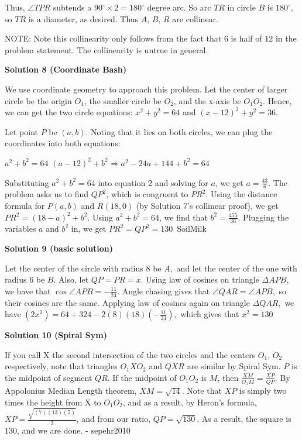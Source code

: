 \begin{enumerate}
 Thus, $\angle TPR$ subtends a $90^\circ \times 2 = 180^\circ$ degree arc. So arc $TR$ in circle $B$ is $180^\circ$, so $TR$ is a diameter, as desired. Thus $A$, $B$, $R$ are collinear.

 NOTE: Note this collinearity only follows from the fact that $6$ is half of $12$ in the problem statement. The collinearity is untrue in general.

 



\textbf{Solution 8 (Coordinate Bash)}

We use coordinate geometry to approach this problem. Let the center of larger circle be the origin $O_1$, the smaller circle be $O_2$, and the x-axis be $O_1O_2$. Hence, we can get the two circle equations: $x^2+y^2 = 64$ and $(x-12)^2+y^2=36$.

 Let point $P$ be $(a, b)$. Noting that it lies on both circles, we can plug the coordinates into both equations:

 $a^2 +b^2 = 64$
$(a-12)^2+ b^2 \Rightarrow a^2-24a+144+b^2 = 64$

 Substituting $a^2+b^2 = 64$ into equation 2 and solving for $a$, we get $a = \frac{43}{6}$. The problem asks us to find $QP^2$, which is congruent to $PR^2$. Using the distance formula for $P(a, b)$ and $R(18, 0)$ (by Solution 7's collinear proof), we get $PR^2 = (18-a)^2 +b^2$. Using $a^2+b^2 = 64$, we find that $b^2 = \frac{455}{36}$. Plugging the variables $a$ and $b^2$ in, we get $PR^2 = QP^2 =  \boxed{130}$~SoilMilk

 



\textbf{Solution 9 (basic solution)}

Let the center of the circle with radius $8$ be $A,$ and let the center of the one with radius $6$ be $B.$ Also, let $QP = PR = x.$ Using law of cosines on triangle $\Delta APB,$ we have that $\cos{\angle{APB}} = -\frac{{11}}{24}.$ Angle chasing gives that $\angle{QAR} = \angle{APB},$ so their cosines are the same. Applying law of cosines again on triangle $\Delta QAR,$ we have $\left(2x^2\right)=64+324-2(8)(18)\left(-\frac{11}{24}\right),$ which gives that $x^2 = \boxed{130}$




\textbf{Solution 10 (Spiral Sym)}

If you call X the second intersection of the two circles and the centers $O_1$, $O_2$ respectively, note that triangles $O_1 X O_2$ and $Q X R$ are similar by Spiral Sym. $P$ is the midpoint of segment $Q R$. If the midpoint of $O_1 O_2$ is $M$, then $\frac{X M}{O_1 M} = \frac{X P}{Q P}$. By Appolonius Median Length theorem, $X M = \sqrt{14}$. Note that $X P$ is simply two times the height from X to $O_1O_2$, and as a result, by Heron's formula, $X P = \frac{\sqrt{(7)(13)(5)}}{3}$, and from our ratio, $Q P = \sqrt{130}$. As a result, the square is $130$, and we are done. - sepehr2010


\end{enumerate}
